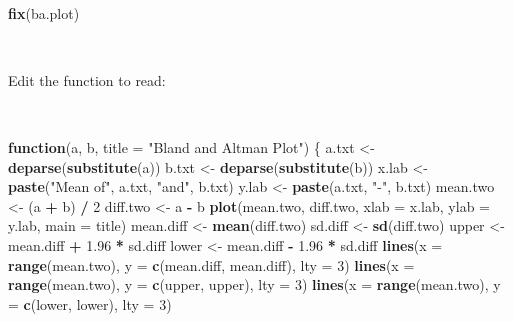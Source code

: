 \documentclass[12pt,a4paper]{book}
\newenvironment{Shaded}{\begin{snugshade}}{\end{snugshade}}
\newcommand{\ControlFlowTok}[1]{\textcolor[rgb]{0.13,0.29,0.53}{\textbf{#1}}}
\newcommand{\DataTypeTok}[1]{\textcolor[rgb]{0.13,0.29,0.53}{#1}}
\newcommand{\DecValTok}[1]{\textcolor[rgb]{0.00,0.00,0.81}{#1}}
\newcommand{\FloatTok}[1]{\textcolor[rgb]{0.00,0.00,0.81}{#1}}
\newcommand{\KeywordTok}[1]{\textcolor[rgb]{0.13,0.29,0.53}{\textbf{#1}}}
\newcommand{\NormalTok}[1]{#1}
\newcommand{\OperatorTok}[1]{\textcolor[rgb]{0.81,0.36,0.00}{\textbf{#1}}}
\newcommand{\StringTok}[1]{\textcolor[rgb]{0.31,0.60,0.02}{#1}}
\theoremstyle{definition}
\theoremstyle{definition}
\theoremstyle{definition}
\theoremstyle{remark}
\begin{document}
~

\begin{Shaded}
\begin{Highlighting}[]
\KeywordTok{fix}\NormalTok{(ba.plot)}
\end{Highlighting}
\end{Shaded}

~

Edit the function to read:

~

\begin{Shaded}
\begin{Highlighting}[]
\ControlFlowTok{function}\NormalTok{(a, b, }\DataTypeTok{title =} \StringTok{"Bland and Altman Plot"}\NormalTok{) \{}
\NormalTok{  a.txt <-}\StringTok{ }\KeywordTok{deparse}\NormalTok{(}\KeywordTok{substitute}\NormalTok{(a))}
\NormalTok{  b.txt <-}\StringTok{ }\KeywordTok{deparse}\NormalTok{(}\KeywordTok{substitute}\NormalTok{(b))}
\NormalTok{  x.lab <-}\StringTok{ }\KeywordTok{paste}\NormalTok{(}\StringTok{"Mean of"}\NormalTok{, a.txt, }\StringTok{"and"}\NormalTok{, b.txt)}
\NormalTok{  y.lab <-}\StringTok{ }\KeywordTok{paste}\NormalTok{(a.txt, }\StringTok{"-"}\NormalTok{, b.txt)}
\NormalTok{  mean.two <-}\StringTok{ }\NormalTok{(a }\OperatorTok{+}\StringTok{ }\NormalTok{b) }\OperatorTok{/}\StringTok{ }\DecValTok{2}
\NormalTok{  diff.two <-}\StringTok{ }\NormalTok{a }\OperatorTok{-}\StringTok{ }\NormalTok{b}
  \KeywordTok{plot}\NormalTok{(mean.two, diff.two, }\DataTypeTok{xlab =}\NormalTok{ x.lab, }\DataTypeTok{ylab =}\NormalTok{ y.lab, }\DataTypeTok{main =}\NormalTok{ title) }
\NormalTok{  mean.diff <-}\StringTok{ }\KeywordTok{mean}\NormalTok{(diff.two)}
\NormalTok{  sd.diff <-}\StringTok{ }\KeywordTok{sd}\NormalTok{(diff.two)}
\NormalTok{  upper <-}\StringTok{ }\NormalTok{mean.diff }\OperatorTok{+}\StringTok{ }\FloatTok{1.96} \OperatorTok{*}\StringTok{ }\NormalTok{sd.diff}
\NormalTok{  lower <-}\StringTok{ }\NormalTok{mean.diff }\OperatorTok{-}\StringTok{ }\FloatTok{1.96} \OperatorTok{*}\StringTok{ }\NormalTok{sd.diff}
  \KeywordTok{lines}\NormalTok{(}\DataTypeTok{x =} \KeywordTok{range}\NormalTok{(mean.two), }\DataTypeTok{y =} \KeywordTok{c}\NormalTok{(mean.diff, mean.diff), }\DataTypeTok{lty =} \DecValTok{3}\NormalTok{) }
  \KeywordTok{lines}\NormalTok{(}\DataTypeTok{x =} \KeywordTok{range}\NormalTok{(mean.two), }\DataTypeTok{y =} \KeywordTok{c}\NormalTok{(upper, upper), }\DataTypeTok{lty =} \DecValTok{3}\NormalTok{)}
  \KeywordTok{lines}\NormalTok{(}\DataTypeTok{x =} \KeywordTok{range}\NormalTok{(mean.two), }\DataTypeTok{y =} \KeywordTok{c}\NormalTok{(lower, lower), }\DataTypeTok{lty =} \DecValTok{3}\NormalTok{)}

\end{Highlighting}
\end{Shaded}
\end{document}

